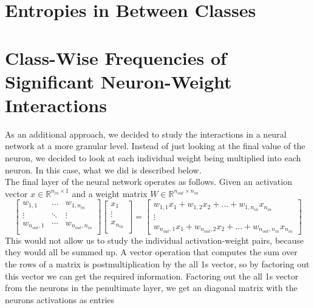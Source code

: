 \documentclass{article}
\begin{document}
    \section{Entropies in Between Classes}
        
    \section{Class-Wise Frequencies of Significant Neuron-Weight Interactions}
    As an additional approach, we decided to study the interactions in a neural network at a more granular level. Instead of just looking at the final value of the neuron, we decided to look at each individual weight being multiplied into each neuron. In this case, what we did is described below. \\
    The final layer of the neural network operates as follows. Given an activation vector $x \in \mathbb{R}^{n_{in} \times 1}$ and a weight matrix $W \in \mathbb{R}^{n_{out} \times n_{in}}$ \\
        \[
            \begin{bmatrix}
                w_{1,1} & \dots & w_{1,n_{in}} \\
                \vdots & \ddots & \vdots \\
                w_{n_{out}, 1} & \cdots & w_{n_{out}, n_{in}} \\
            \end{bmatrix}
            \begin{bmatrix}
                x_1 \\
                \vdots \\
                x_{n_{in}} \\
            \end{bmatrix}
            = 
            \begin{bmatrix}
                w_{1,1}x_1 + w_{1, 2}x_2 + \dots + w_{1, n_{in}}x_{n_{in}} \\
                \vdots \\
                w_{n_{out},1}x_1 + w_{n_{out}, 2}x_2 + \dots + w_{n_{out}, n_{in}}x_{n_{in}}
            \end{bmatrix}
        \]
        This would not allow us to study the individual activation-weight pairs, because they would all be summed up. A vector operation that computes the sum over the rows of a matrix is postmultiplication by the all 1s vector, so by factoring out this vector we can get the required information. Factoring out the all 1s vector from the neurons in the penultimate layer, we get an diagonal matrix with the neurons activations as entries \\
\end{document}
